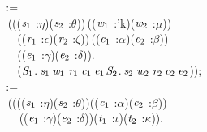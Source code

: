 \,\,\,\,\,\,\,\,\,\,:=\\
\,\,\,\,\,\,\,\,\,\,\,(\HOLTokenLambda{}((\ensuremath{\HOLBoundVar{s}\sb{\mathrm{1}}} :\ensuremath{\eta})\HOLSymConst{,}(\ensuremath{\HOLBoundVar{s}\sb{\mathrm{2}}} :\ensuremath{\theta}))\,((\ensuremath{\HOLBoundVar{w}\sb{\mathrm{1}}} :'k)\HOLSymConst{,}(\ensuremath{\HOLBoundVar{w}\sb{\mathrm{2}}} :\ensuremath{\mu}))\\
\,\,\,\,\,\,\,\,\,\,\,\,\,\,\,\,((\ensuremath{\HOLBoundVar{r}\sb{\mathrm{1}}} :\ensuremath{\epsilon})\HOLSymConst{,}(\ensuremath{\HOLBoundVar{r}\sb{\mathrm{2}}} :\ensuremath{\zeta}))\,((\ensuremath{\HOLBoundVar{c}\sb{\mathrm{1}}} :\ensuremath{\alpha})\HOLSymConst{,}(\ensuremath{\HOLBoundVar{c}\sb{\mathrm{2}}} :\ensuremath{\beta}))\\
\,\,\,\,\,\,\,\,\,\,\,\,\,\,\,\,((\ensuremath{\HOLBoundVar{e}\sb{\mathrm{1}}} :\ensuremath{\gamma})\HOLSymConst{,}(\ensuremath{\HOLBoundVar{e}\sb{\mathrm{2}}} :\ensuremath{\delta})).\\
\,\,\,\,\,\,\,\,\,\,\,\,\,\,\,\,(\ensuremath{\HOLFreeVar{S}\sb{\mathrm{1}}}.\,\ensuremath{\HOLBoundVar{s}\sb{\mathrm{1}}}\,\ensuremath{\HOLBoundVar{w}\sb{\mathrm{1}}}\,\ensuremath{\HOLBoundVar{r}\sb{\mathrm{1}}}\,\ensuremath{\HOLBoundVar{c}\sb{\mathrm{1}}}\,\ensuremath{\HOLBoundVar{e}\sb{\mathrm{1}}}\HOLSymConst{,}\ensuremath{\HOLFreeVar{S}\sb{\mathrm{2}}}.\,\ensuremath{\HOLBoundVar{s}\sb{\mathrm{2}}}\,\ensuremath{\HOLBoundVar{w}\sb{\mathrm{2}}}\,\ensuremath{\HOLBoundVar{r}\sb{\mathrm{2}}}\,\ensuremath{\HOLBoundVar{c}\sb{\mathrm{2}}}\,\ensuremath{\HOLBoundVar{e}\sb{\mathrm{2}}}));\\
\,\,\,\,\,\,\,\,\,\,:=\\
\,\,\,\,\,\,\,\,\,\,\,(\HOLTokenLambda{}(((\ensuremath{\HOLBoundVar{s}\sb{\mathrm{1}}} :\ensuremath{\eta})\HOLSymConst{,}(\ensuremath{\HOLBoundVar{s}\sb{\mathrm{2}}} :\ensuremath{\theta}))\HOLSymConst{,}((\ensuremath{\HOLBoundVar{c}\sb{\mathrm{1}}} :\ensuremath{\alpha})\HOLSymConst{,}(\ensuremath{\HOLBoundVar{c}\sb{\mathrm{2}}} :\ensuremath{\beta}))\HOLSymConst{,}\\
\,\,\,\,\,\,\,\,\,\,\,\,\,\,\,\,\,((\ensuremath{\HOLBoundVar{e}\sb{\mathrm{1}}} :\ensuremath{\gamma})\HOLSymConst{,}(\ensuremath{\HOLBoundVar{e}\sb{\mathrm{2}}} :\ensuremath{\delta}))\HOLSymConst{,}(\ensuremath{\HOLBoundVar{t}\sb{\mathrm{1}}} :\ensuremath{\iota})\HOLSymConst{,}(\ensuremath{\HOLBoundVar{t}\sb{\mathrm{2}}} :\ensuremath{\kappa})).\\
